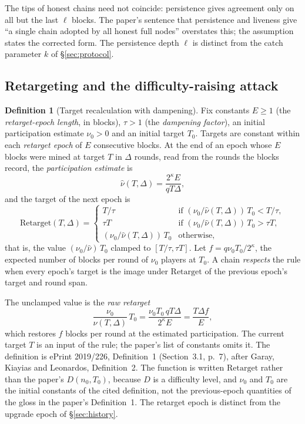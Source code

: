 \documentclass[11pt,a4paper]{article}
\theoremstyle{definition}
\newtheorem{definition}[theorem]{Definition}
\begin{document}
The tips of honest chains need not coincide: persistence gives agreement
only on all but the last $\ell$ blocks. The paper's sentence that
persistence and liveness give ``a single chain adopted by all honest full
nodes'' overstates this; the assumption states the corrected form. The
persistence depth $\ell$ is distinct from the catch parameter $k$ of
\S\ref{sec:protocol}.

\subsection{Retargeting and the difficulty-raising attack}
\label{sec:model-retarget}

\begin{definition}[Target recalculation with dampening]\label{def:retarget}
Fix constants $E \ge 1$ (the \emph{retarget-epoch length}, in blocks),
$\tau > 1$ (the \emph{dampening factor}), an initial participation estimate
$\nu_0 > 0$ and an initial target $T_0$. Targets are constant within each
\emph{retarget epoch} of $E$ consecutive blocks. At the end of an epoch whose
$E$ blocks were mined at target $T$ in $\Delta$ rounds, read from the rounds
the blocks record, the \emph{participation estimate} is
\[
  \hat\nu(T, \Delta) = \frac{2^\kappa E}{q T \Delta} ,
\]
and the target of the next epoch is
\[
  \mathrm{Retarget}(T, \Delta) =
  \begin{cases}
    T / \tau & \text{if } (\nu_0 / \hat\nu(T, \Delta))\, T_0 < T / \tau, \\
    \tau T & \text{if } (\nu_0 / \hat\nu(T, \Delta))\, T_0 > \tau T, \\
    (\nu_0 / \hat\nu(T, \Delta))\, T_0 & \text{otherwise,}
  \end{cases}
\]
that is, the value $(\nu_0 / \hat\nu)\, T_0$ clamped to
$[T / \tau, \tau T]$. Let $f = q \nu_0 T_0 / 2^\kappa$, the expected number
of blocks per round of $\nu_0$ players at $T_0$. A chain \emph{respects} the
rule when every epoch's target is the image under $\mathrm{Retarget}$ of the
previous epoch's target and round span.
\end{definition}

The unclamped value is the \emph{raw retarget}
\[
  \frac{\nu_0}{\hat\nu(T, \Delta)}\, T_0
  = \frac{\nu_0 T_0 \, q T \Delta}{2^\kappa E}
  = \frac{T \Delta f}{E} ,
\]
which restores $f$ blocks per round at the estimated participation. The
current target $T$ is an input of the rule; the paper's list of constants
omits it. The definition is ePrint 2019/226, Definition~1 (Section~3.1,
p.~7), after Garay, Kiayias and Leonardos, Definition~2. The function is
written $\mathrm{Retarget}$ rather than the paper's $D(n_0, T_0)$, because
$D$ is a difficulty level, and $\nu_0$ and $T_0$ are the initial constants of
the cited definition, not the previous-epoch quantities of the gloss in
the paper's Definition~1. The retarget epoch is distinct from the upgrade
epoch of \S\ref{sec:history}.
\end{document}
